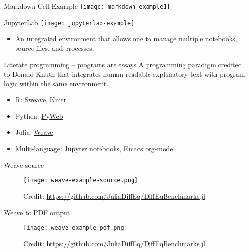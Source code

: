 \documentclass{beamer}
\begin{document}
\begin{frame}{Markdown Cell Example}
  \center
  \texttt{[image: markdown-example1]}
\end{frame}

\begin{frame}{JupyterLab}
  \center
  \texttt{[image: jupyterlab-example]}
  \begin{itemize}
    \item An integrated environment that allows one to manage multiple notebooks, source files, and processes.
  \end{itemize}
\end{frame}

\begin{frame}{Literate programming -- programs are essays}
  A programming paradigm credited to Donald Knuth that integrates human-readable explanatory text with program logic within the same environment.

  \begin{itemize}
    \item R: \href{https://support.rstudio.com/hc/en-us/articles/200552056-Using-Sweave-and-knitr}{Sweave}, \href{https://www.r-project.org/nosvn/pandoc/knitr.html}{Knitr}
    \item Python: \href{https://github.com/simsor/PyWeb}{PyWeb}
    \item Julia: \href{https://github.com/JunoLab/Weave.jl}{Weave}
    \item Multi-language: \href{https://jupyter.org/}{Jupyter notebooks}, \href{https://orgmode.org/}{Emacs org-mode}
  \end{itemize}
\end{frame}

\begin{frame}{Weave source}
  \begin{figure}[]
    \centering
    \texttt{[image: weave-example-source.png]}
    \caption{
      Credit: \url{https://github.com/JuliaDiffEq/DiffEqBenchmarks.jl}
    }
  \end{figure}
\end{frame}

\begin{frame}{Weave to PDF output}
  \begin{figure}[]
    \centering
    \texttt{[image: weave-example-pdf.png]}
    \caption{
      Credit: \url{https://github.com/JuliaDiffEq/DiffEqBenchmarks.jl}
    }
  \end{figure}
\end{frame}
\end{document}
